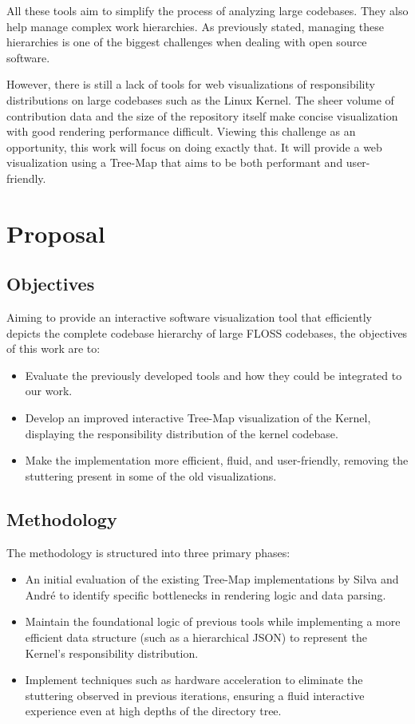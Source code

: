\documentclass[a4paper,12pt,oneside,english,brazilian]{article}
\begin{document}
	\par All these tools aim to simplify the process of analyzing large codebases. They also help manage complex work hierarchies. As previously stated, managing these hierarchies is one of the biggest challenges when dealing with open source software.
	\par However, there is still a lack of tools for web visualizations of responsibility distributions on large codebases such as the Linux Kernel. The sheer volume of contribution data and the size of the repository itself make concise visualization with good rendering performance difficult. Viewing this challenge as an opportunity, this work will focus on doing exactly that. It will provide a web visualization using a Tree-Map \cite{treemap} that aims to be both performant and user-friendly.
	
	\section{Proposal}
	\subsection{Objectives}
	Aiming to provide an interactive software visualization tool that efficiently depicts the complete codebase hierarchy of large FLOSS codebases, the objectives of this work are to:
	\begin{itemize}
		\item Evaluate the previously developed tools and how they could be integrated to our work.
		\item Develop an improved interactive Tree-Map \cite{treemap} visualization of the Kernel, displaying the responsibility distribution of the kernel codebase.
		\item Make the implementation more efficient, fluid, and user-friendly, removing the stuttering present in some of the old visualizations.
	\end{itemize}
	\subsection{Methodology}
	The methodology is structured into three primary phases:
	\begin{itemize}
		\item An initial evaluation of the existing Tree-Map implementations by Silva and André to identify specific bottlenecks in rendering logic and data parsing.
		\item Maintain the foundational logic of previous tools while implementing a more efficient data structure (such as a hierarchical JSON) to represent the Kernel’s responsibility distribution.
		\item Implement techniques such as hardware acceleration to eliminate the stuttering observed in previous iterations, ensuring a fluid interactive experience even at high depths of the directory tree.
	\end{itemize}
	\newpage
\end{document}
